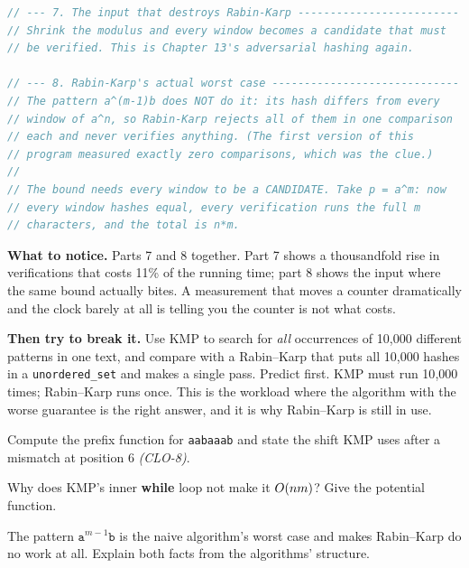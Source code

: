 \begin{lab}
\begin{lstlisting}[language=C++]
// --- 7. The input that destroys Rabin-Karp -------------------------
// Shrink the modulus and every window becomes a candidate that must
// be verified. This is Chapter 13's adversarial hashing again.

// --- 8. Rabin-Karp's actual worst case -----------------------------
// The pattern a^(m-1)b does NOT do it: its hash differs from every
// window of a^n, so Rabin-Karp rejects all of them in one comparison
// each and never verifies anything. (The first version of this
// program measured exactly zero comparisons, which was the clue.)
//
// The bound needs every window to be a CANDIDATE. Take p = a^m: now
// every window hashes equal, every verification runs the full m
// characters, and the total is n*m.
\end{lstlisting}

\textbf{What to notice.} Parts 7 and 8 together. Part 7 shows a thousandfold
rise in verifications that costs 11\% of the running time; part 8 shows the
input where the same bound actually bites. A measurement that moves a counter
dramatically and the clock barely at all is telling you the counter is not what
costs.

\smallskip
\textbf{Then try to break it.} Use KMP to search for \emph{all} occurrences of
10{,}000 different patterns in one text, and compare with a Rabin--Karp that
puts all 10{,}000 hashes in a \texttt{unordered\_set} and makes a single pass.
Predict first. KMP must run 10{,}000 times; Rabin--Karp runs once. This is the
workload where the algorithm with the worse guarantee is the right answer, and
it is why Rabin--Karp is still in use.
\end{lab}

\begin{checkpoint}
\begin{tightnum}
  \item Compute the prefix function for \texttt{aabaaab} and state the shift
        KMP uses after a mismatch at position 6 \emph{(CLO-8)}.
  \item Why does KMP's inner \textbf{while} loop not make it $O(nm)$? Give
        the potential function.
  \item The pattern $\texttt{a}^{m-1}\texttt{b}$ is the naive algorithm's worst
        case and makes Rabin--Karp do no work at all. Explain both facts from
        the algorithms' structure.
\end{tightnum}
\end{checkpoint}

